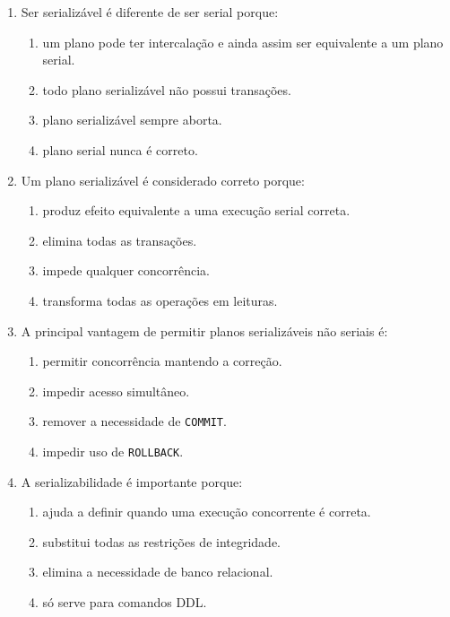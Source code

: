 \documentclass[12pt,a4paper]{article}
\begin{document}
\begin{enumerate}[label=\textbf{Q\arabic*.}]
\item Ser serializável é diferente de ser serial porque:

\begin{enumerate}[label=\alph*)]
    \item um plano pode ter intercalação e ainda assim ser equivalente a um plano serial.
    \item todo plano serializável não possui transações.
    \item plano serializável sempre aborta.
    \item plano serial nunca é correto.
\end{enumerate}

\item Um plano serializável é considerado correto porque:

\begin{enumerate}[label=\alph*)]
    \item produz efeito equivalente a uma execução serial correta.
    \item elimina todas as transações.
    \item impede qualquer concorrência.
    \item transforma todas as operações em leituras.
\end{enumerate}

\item A principal vantagem de permitir planos serializáveis não seriais é:

\begin{enumerate}[label=\alph*)]
    \item permitir concorrência mantendo a correção.
    \item impedir acesso simultâneo.
    \item remover a necessidade de \texttt{COMMIT}.
    \item impedir uso de \texttt{ROLLBACK}.
\end{enumerate}

\item A serializabilidade é importante porque:

\begin{enumerate}[label=\alph*)]
    \item ajuda a definir quando uma execução concorrente é correta.
    \item substitui todas as restrições de integridade.
    \item elimina a necessidade de banco relacional.
    \item só serve para comandos DDL.
\end{enumerate}


\end{enumerate}
\end{document}

